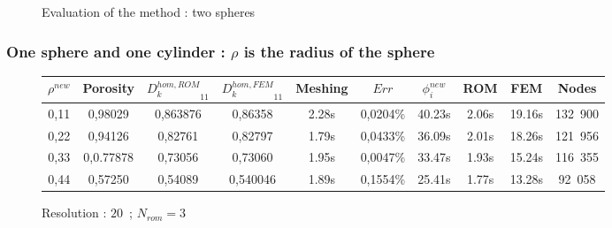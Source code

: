 {\ligneinter
\begin{figure}[H]%
%
\begin{table}[H]
\begin{center}
%
%
\qquad
{}%
%
\end{center}
\end{table}
%
\caption{Evaluation of the method : two spheres}
\end{figure}

\subsubsection{One sphere and one cylinder : $\rho$ is the radius of the sphere}

\begin{figure}[H]%
%
\begin{center}
\begin{tabular}{|c|c||c|c||c|c||c|c||c||c|}
\hline
\rowcolor{lightgray} $\rho^{new}$&Porosity&${D_k^{hom,ROM}}_{11}$&${D_k^{hom,FEM}}_{11}$&Meshing&$Err$&$\phi_i^{new}$&ROM&FEM&Nodes\\
\hline
0,11&0,98029&0,863876&0,86358&2.28s&0,0204\%&40.23s&2.06s&19.16s&132\ 900\\
\hline
0,22&0,94126&0,82761&0,82797&1.79s&0,0433\%&36.09s&2.01s&18.26s&121\ 956\\
\hline
0,33&0,0.77878&0,73056&0,73060&1.95s&0,0047\%&33.47s&1.93s&15.24s&116\ 355\\
\hline
0,44&0,57250&0,54089&0,540046&1.89s&0,1554\%&25.41s&1.77s&13.28s&92\ 058\\
\hline
\end{tabular}
\end{center}
\caption{Resolution : $20$\ ; $N_{rom}=3$}
%
\end{figure}

}
